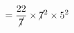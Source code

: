 \documentclass[preview]{standalone}
\begin{document}
\begin{align*}
\special{dvisvgm:raw <g id='unique000'>}= \frac{22}{\cancel{7}} \times \cancel{7}^2 \times 5^2\special{dvisvgm:raw </g>}
\end{align*}
\end{document}
